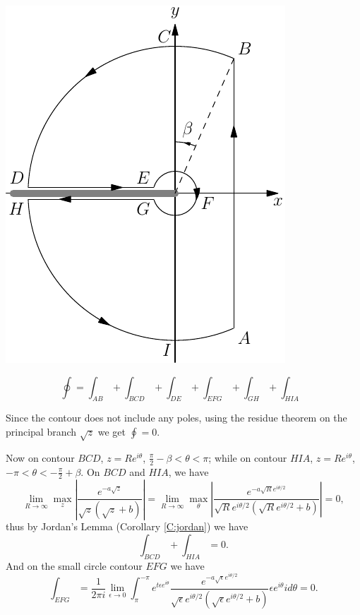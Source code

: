 \begin{marginfigure} 
  \includegraphics{graphics/contour.pdf}
\end{marginfigure}

\[
  \oint = \int_{AB} + \int_{BCD} + \int_{DE} + \int_{EFG} + \int_{GH}
          + \int_{HIA}
\]

Since the contour does not include any poles, using the residue theorem on the
principal branch $\sqrt{z}$ we get $\oint =0$. 

Now on contour $BCD$, 
$z=R e^{i\theta}$, $\frac{\pi}{2}-\beta <\theta <\pi$; while on contour $HIA$, 
$z=R e^{i\theta}$, $-\pi <\theta < -\frac{\pi}{2}+\beta$. On $BCD$ and
$HIA$, we have
\[
  \lim_{R\to \infty} 
    \max_z \left| \frac{e^{-a\sqrt{z}}}{\sqrt{z}(\sqrt{z}+b)} \right|
  = \lim_{R\to \infty} \max_{\theta} 
      \left| 
        \frac{e^{-a\sqrt{R} e^{i\theta/2}}}
             { \sqrt{R} e^{i\theta/2} (\sqrt{R} e^{i\theta/2} + b) }
      \right|
  = 0,
\]
thus by Jordan's Lemma (Corollary \ref{C:jordan}) we have
\[
  \int_{BCD} + \int_{HIA} = 0.
\]
And on the small circle contour $EFG$ we have
\[
	\int_{EFG} 
	= \frac{1}{2\pi i} 
	  \lim_{\epsilon\to 0} \int_{\pi}^{-\pi} e^{t\epsilon e^{i\theta}}
	    \frac{e^{-a\sqrt{\epsilon} e^{i\theta/2}}}
             { \sqrt{\epsilon} e^{i\theta/2} (\sqrt{\epsilon} e^{i\theta/2} + b)}
        \epsilon e^{i\theta} i d\theta
	= 0.
\]

